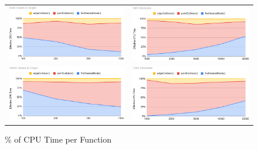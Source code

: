 \begin{figure}[H]
\begin{center}
\begin{tabular}{c | c}
\includegraphics[width=0.45\linewidth]{../master/rrt/img/performance/nodes/5000nodes.png} & \includegraphics[width=0.45\linewidth]{../master/rrt/img/performance/obs/500obs.png} \\
\includegraphics[width=0.45\linewidth]{../master/rrt/img/performance/nodes/10000nodes.png} & \includegraphics[width=0.45\linewidth]{../master/rrt/img/performance/obs/1000obs.png} \\
\end{tabular}
\caption{\% of CPU Time per Function}
\label{table:rrtPerformance}
\end{center}
\end{figure}

